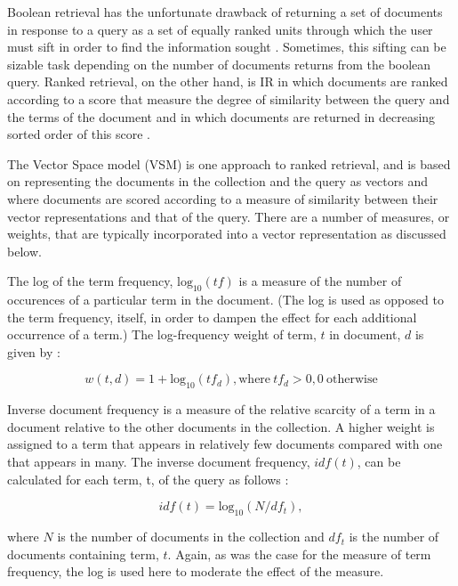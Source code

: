 Boolean retrieval has the unfortunate drawback of returning a set of documents in response to a query as a set of equally ranked units through which the user must sift in order to find the information sought \cite{manning_2008_introduction_ch6}.  Sometimes, this sifting can be sizable task depending on the number of documents returns from the boolean query.  Ranked retrieval, on the other hand, is IR in which documents are ranked according to a score that measure the degree of similarity between the query and the terms of the document and in which documents are returned in decreasing sorted order of this score \cite{manning_2008_introduction_ch6}.  

The Vector Space model (VSM) \cite{manning_2008_introduction_ch6} is one approach to ranked retrieval, and is based on representing the documents in the collection and the query as vectors and where documents are scored according to a measure of similarity between their vector representations and that of the query.  There are a number of measures, or weights, that are typically incorporated into a vector representation as discussed below.

The log of the term frequency, $\textrm{log}_{10}(tf)$ is a measure of the number of occurences of a particular term in the document.  (The log is used as opposed to the term frequency, itself, in order to dampen the effect for each additional occurrence of a term.)  The log-frequency weight of term, $t$ in document, $d$ is given by \cite{manning_2008_introduction_ch6}:

\begin{equation}
w(t,d) = 1 + \textrm{log}_{10}(tf_d), \textrm{where}\ tf_d > 0, 0\  \textrm{otherwise}
\end{equation}

Inverse document frequency is a measure of the relative scarcity of a term in a document relative to the other documents in the collection.  A higher weight is assigned to a term that appears in relatively few documents compared with one that appears in many.  The inverse document frequency, $idf(t)$, can be calculated for each term, t, of the query as follows \cite{manning_2008_introduction_ch6}:  

\begin{equation}
idf(t)  = \textrm{log}_{10}(N/df_t),
\end{equation}

\noindent
where $N$ is the number of documents in the collection and $df_t$ is the number of documents containing term, $t$.  Again, as was the case for the measure of term frequency, the log is used here to moderate the effect of the measure.

